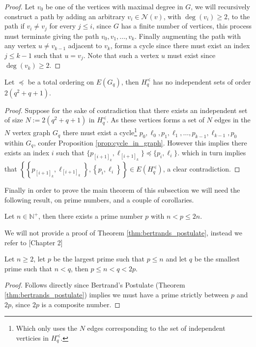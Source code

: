 \begin{proof}
	Let $v_{0}$ be one of the vertices with maximal degree in $G$, we will recursively construct a path by adding an arbitrary $v_i \in \mathcal{N}(v)$, with $\deg(v_i) \geq 2$, to the path if $v_i \neq v_j$ for every $j \leq i$, since $G$ has a finite number of vertices, this process must terminate giving the path $v_0, v_1, \ldots, v_{k}$. Finally augmenting the path with any vertex $u \neq v_{k - 1}$ adjacent to $v_k$, forms a cycle since there must exist an index $j \leq k - 1$ such that $u = v_{j}$. Note that such a vertex $u$ must exist since $\deg(v_k) \geq 2$.
\end{proof}

\begin{lemma}\label{lem:no_independent_sets}
	Let $\preccurlyeq$ be a total ordering on $E(G_q)$, then $H_q^{\preccurlyeq}$ has no independent sets of order $2(q^2 + q + 1)$.
\end{lemma}
\begin{proof}
	Suppose for the sake of contradiction that there exists an independent set of size $N := 2(q^2 + q + 1)$ in $H_q^{\preccurlyeq}$. As these vertices forms a set of $N$ edges in the $N$ vertex graph $G_q$ there must exist a cycle\footnote{Which only uses the $N$ edges corresponding to the set of independent verticies in $H_q^{\preccurlyeq}$.} $p_0, \ell_0, p_1, \ell_1, \ldots, p_{k - 1}, \ell_{k - 1}, p_{0}$ within $G_q$, confer Proposition \ref{prop:cycle_in_graph}. However this implies there exists an index $i$ such that $\{p_{[i + 1]_{k}}, \ell_{[i + 1]_{k}}\} \preccurlyeq \{p_i, \ell_i\}$. which in turn implies that $\left\{\left\{p_{[i + 1]_k}, \ell_{[i + 1]_k}\right\}, \left\{p_i, \ell_{i}\right\}\right\} \in E(H_q^{\preccurlyeq})$, a clear contradiction.
\end{proof}

Finally in order to prove the main theorem of this subsection we will need the following result, on prime numbers, and a couple of corollaries.
\begin{theorem}\label{thm:bertrands_postulate}
	Let $n \in \mathbb{N}^+$, then there exists a prime number $p$ with $n < p \leq 2n$.
\end{theorem}
We will not provide a proof of Theorem \ref{thm:bertrands_postulate}, instead we refer to \cite{proofs_from_the_book}[Chapter 2]
\begin{corollary}\label{cor:bertrands_postulate}
	Let $n \geq 2$, let $p$ be the largest prime such that $p \leq n$ and let $q$ be the smallest prime such that $n < q$, then $p \leq n < q < 2p$.
\end{corollary}
\begin{proof}
	Follows directly since Bertrand's Postulate (Theorem \ref{thm:bertrands_postulate}) implies we must have a prime strictly between $p$ and $2p$, since $2p$ is a composite number.
\end{proof}

